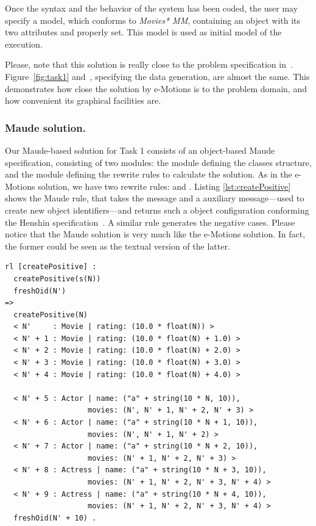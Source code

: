 Once the syntax and the behavior of the system has been coded, the user may specify a model, which conforms to \textit{Movies* MM}, containing an object  with its two attributes  and  properly set. This model is used as initial model of the execution.

Please, note that this solution is really close to the problem specification in~\cite{imdbcase}. Figure~\ref{fig:task1} and~\cite[Figure~2]{imdbcase}, specifying the data generation, are almost the same. This demonstrates how close the solution by e-Motions is to the problem domain, and how convenient its graphical facilities are.

\subsubsection{Maude solution.}
Our Maude-based solution for Task 1 consists of an object-based Maude specification, consisting of two modules: the  module defining the classes structure, and the  module defining the rewrite rules to calculate the solution. As in the e-Motions solution, we have two rewrite rules:  and . Listing \ref{lst:createPositive} shows the  Maude rule, that takes the  message and a  auxiliary message---used to create new object identifiers---and returns such a object configuration conforming the Henshin specification~\cite{imdbcase}. A similar rule generates the negative cases. Please notice that the Maude solution is very much like the e-Motions solution. In fact, the former could be seen as the textual version of the latter. 

\begin{lstlisting}[caption=\code{createPositive} Maude rule., label=lst:createPositive]
rl [createPositive] :
  createPositive(s(N))
  freshOid(N')
=>
  createPositive(N)
  < N'     : Movie | rating: (10.0 * float(N)) >
  < N' + 1 : Movie | rating: (10.0 * float(N) + 1.0) >
  < N' + 2 : Movie | rating: (10.0 * float(N) + 2.0) >
  < N' + 3 : Movie | rating: (10.0 * float(N) + 3.0) >
  < N' + 4 : Movie | rating: (10.0 * float(N) + 4.0) >
  
  < N' + 5 : Actor | name: ("a" + string(10 * N, 10)),
                   movies: (N', N' + 1, N' + 2, N' + 3) >
  < N' + 6 : Actor | name: ("a" + string(10 * N + 1, 10)),
                   movies: (N', N' + 1, N' + 2) >
  < N' + 7 : Actor | name: ("a" + string(10 * N + 2, 10)),
                   movies: (N' + 1, N' + 2, N' + 3) >
  < N' + 8 : Actress | name: ("a" + string(10 * N + 3, 10)),
                   movies: (N' + 1, N' + 2, N' + 3, N' + 4) >
  < N' + 9 : Actress | name: ("a" + string(10 * N + 4, 10)),
                   movies: (N' + 1, N' + 2, N' + 3, N' + 4) >
  freshOid(N' + 10) .
\end{lstlisting}

